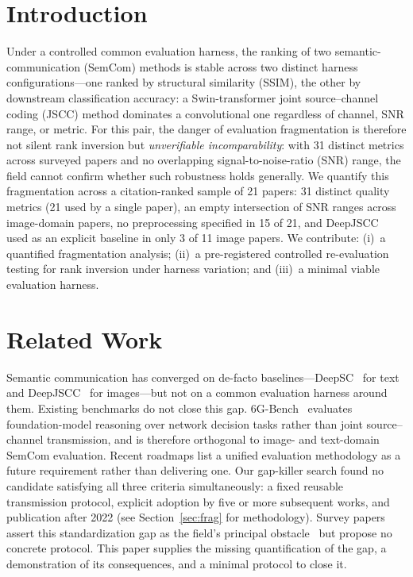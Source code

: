 \documentclass[conference]{IEEEtran}
\begin{document}
\section{Introduction}\label{sec:intro}
Under a controlled common evaluation harness, the ranking of two semantic-communication
(SemCom) methods is stable across two distinct harness configurations---one ranked by
structural similarity (SSIM), the other by downstream classification accuracy: a
Swin-transformer joint source--channel coding (JSCC) method dominates a convolutional one
regardless of channel, SNR range, or metric. For this pair, the danger of evaluation
fragmentation is therefore not silent rank inversion but \emph{unverifiable
incomparability}: with 31 distinct metrics across surveyed papers and no overlapping
signal-to-noise-ratio (SNR) range, the field cannot confirm whether such robustness holds
generally. We quantify this fragmentation across a citation-ranked sample of 21 papers:
31 distinct quality metrics (21 used by a single paper), an empty intersection of SNR
ranges across image-domain papers, no preprocessing specified in 15 of 21, and
DeepJSCC~\cite{deepjscc} used as an explicit baseline in only 3 of 11 image papers. We
contribute: (i)~a quantified fragmentation analysis; (ii)~a pre-registered controlled
re-evaluation testing for rank inversion under harness variation; and (iii)~a minimal
viable evaluation harness.

\section{Related Work}\label{sec:related}
Semantic communication has converged on de-facto baselines---DeepSC~\cite{deepsc}
for text and DeepJSCC~\cite{deepjscc} for images---but not on a common evaluation
harness around them. Existing benchmarks do not close this gap.
6G-Bench~\cite{sixgbench} evaluates foundation-model reasoning over network decision
tasks rather than joint source--channel transmission, and is therefore orthogonal to
image- and text-domain SemCom evaluation. Recent roadmaps list a unified evaluation
methodology as a future requirement rather than delivering one. Our gap-killer search
found no candidate satisfying all three criteria simultaneously: a fixed reusable
transmission protocol, explicit adoption by five or more subsequent works, and
publication after 2022 (see Section~\ref{sec:frag} for methodology). Survey papers
assert this standardization gap as the field's principal obstacle~\cite{comst,nso}
but propose no concrete protocol. This paper supplies the missing quantification of
the gap, a demonstration of its consequences, and a minimal protocol to close it.
\end{document}
